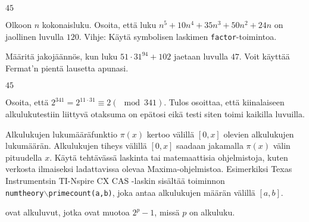 \begin{kotitehtavasivu}
\begin{tehtava}
    \begin{vastaus}
        $45$
    \end{vastaus}
    
\end{tehtava}

\begin{tehtava}
    Olkoon $n$ kokonaisluku. Osoita, että luku $n^5+10n^4+35n^3+50n^2+24n$ on jaollinen luvulla $120$. Vihje: Käytä symbolisen laskimen {\tt factor}-toimintoa.
\end{tehtava}


\begin{tehtava}
    Määritä jakojäännös, kun luku $51\cdot 31^{94}+102$ jaetaan
    luvulla $47$. Voit käyttää Fermat'n pientä lausetta apunasi.
    \begin{vastaus}
    $45$
    \end{vastaus}
\end{tehtava}

\begin{tehtava}
    Osoita, että $2^{341} = 2^{11 \cdot 31} \equiv 2 (\mod 341)
    $. Tulos osoittaa, että kiinalaiseen alkulukutestiin liittyvä
    otaksuma on epätosi eikä testi siten toimi kaikilla luvuilla.
\end{tehtava}

\begin{tehtava}
    Alkulukujen lukumääräfunktio $\pi(x)$ kertoo välillä $[0, x]$
    olevien alkulukujen lukumäärän. Alkulukujen tiheys välillä $[0, x]
    $ saadaan jakamalla $\pi(x)$ välin pituudella $x$.
    Käytä tehtävässä laskinta tai matemaattisia ohjelmistoja, kuten
    verkosta ilmaiseksi ladattavissa olevaa Maxima-ohjelmistoa.
    Esimerkiksi Texas Instrumentsin TI-Nspire CX CAS -laskin sisältää
    toiminnon \\{\tt numtheory$\backslash$primecount(a,b)}, joka antaa
    alkulukujen määrän välillä $[a, b]$.
\end{tehtava}

\begin{tehtava}
     ovat alkuluvut, jotka ovat
    muotoa $2^p - 1$, missä $p$ on alkuluku.
\end{tehtava}
\end{kotitehtavasivu}
